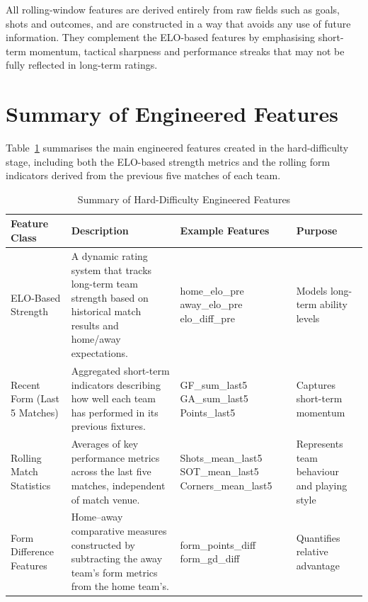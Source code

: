 \documentclass[11pt,a4paper]{article}
\begin{document}
All rolling-window features are derived entirely from raw fields such as goals, shots and outcomes, and are constructed in a way that avoids any use of future information. They complement the ELO-based features by emphasising short-term momentum, tactical sharpness and performance streaks that may not be fully reflected in long-term ratings.

\section{Summary of Engineered Features}

Table~\ref{tab:hard_features} summarises the main engineered features created in the hard-difficulty stage, including both the ELO-based strength metrics and the rolling form indicators derived from the previous five matches of each team.

\begin{table}[h!]
\centering
\begin{tabular}{p{3cm} p{5cm} p{4cm} p{3cm}}
\hline
\textbf{Feature Class} & \textbf{Description} & \textbf{Example Features} & \textbf{Purpose} \\
\hline

ELO-Based Strength &
A dynamic rating system that tracks long-term team strength based on historical match results and home/away expectations. &
home\_elo\_pre \newline away\_elo\_pre \newline elo\_diff\_pre &
Models long-term ability levels \\

Recent Form (Last 5 Matches) &
Aggregated short-term indicators describing how well each team has performed in its previous fixtures. &
GF\_sum\_last5 \newline GA\_sum\_last5 \newline Points\_last5 &
Captures short-term momentum \\

Rolling Match Statistics &
Averages of key performance metrics across the last five matches, independent of match venue. &
Shots\_mean\_last5 \newline SOT\_mean\_last5 \newline Corners\_mean\_last5 &
Represents team behaviour and playing style \\

Form Difference Features &
Home–away comparative measures constructed by subtracting the away team’s form metrics from the home team’s. &
form\_points\_diff \newline form\_gd\_diff &
Quantifies relative advantage \\

\hline
\end{tabular}
\caption{Summary of Hard-Difficulty Engineered Features}
\label{tab:hard_features}
\end{table}
\end{document}
